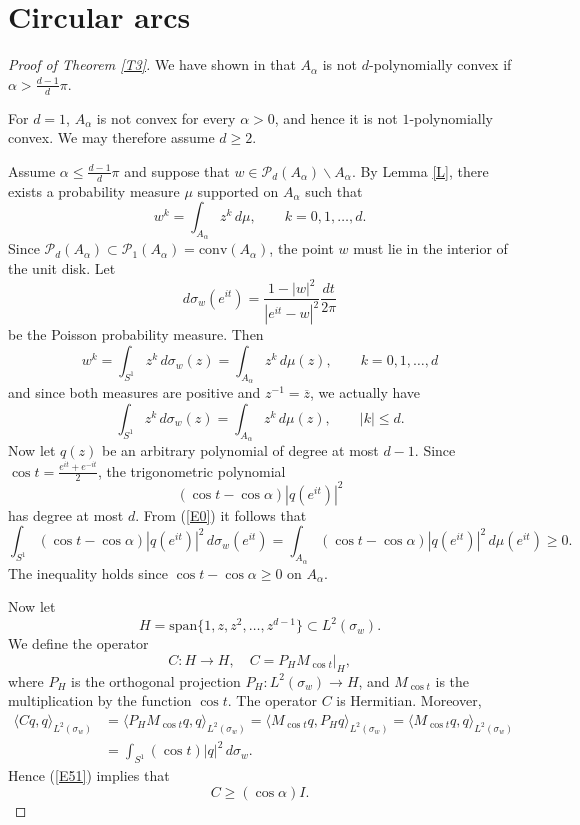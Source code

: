 \documentclass[reqno]{amsart}
\theoremstyle{definition}
\newcommand{\Conv}{{\mathrm{conv}}}
\newcommand{\Span}{{\mathrm{span}}}
\newcommand{\cP}{\mathcal{P}}
\def\bar{\overline}
\numberwithin{equation}{section}
\begin{document}
\section{Circular arcs}
\begin{proof}[Proof of Theorem \ref{T3}] We have shown in \cite[Proposition~16]{S} that $A_\alpha$ is not $d$-polynomially convex if $\alpha>\frac{d-1}{d}\pi$. 

For $d=1$, $A_\alpha$ is not convex for every $\alpha>0$, and hence it is not $1$-polynomially convex. We may therefore assume $d\ge 2$.

Assume $\alpha\le\frac{d-1}{d}\pi$ and suppose that $w\in\cP_d(A_\alpha)\backslash A_\alpha$. 
By Lemma \ref{L}, there exists a probability measure $\mu$ supported on $A_\alpha$ such that 
\[w^k=\int_{A_\alpha} z^k\,d\mu,\qquad k=0,1,\ldots,d.\] 
Since $\cP_d(A_\alpha)\subset\cP_1(A_\alpha)=\Conv(A_\alpha)$, the point $w$ must lie in the interior of the unit disk. Let 
\[d\sigma_w(e^{it})=\frac{1-|w|^2}{|e^{it}-w|^2}\frac{dt}{2\pi}\]
be the Poisson probability measure. Then
\[w^k=\int_{S^1}z^k\,d\sigma_w(z)=\int_{A_\alpha} z^k\,d\mu(z),\qquad k=0,1,\ldots,d\] 
and since both measures are positive and $z^{-1}=\bar z$, we actually have
\begin{equation}\label{E0}
	\int_{S^1}z^k\,d\sigma_w(z)=\int_{A_\alpha} z^k\,d\mu(z),\qquad |k|\le d.
	\end{equation}
Now let $q(z)$ be an arbitrary polynomial of degree at most $d-1$. Since
$\cos t=\frac{e^{it}+e^{-it}}{2}$, the trigonometric polynomial
\[(\cos t-\cos\alpha)|q(e^{it})|^2\] has degree at most $d$. From (\ref{E0}) it follows that
 \begin{equation}\label{E51}
 	\int_{S^1}(\cos t-\cos\alpha)|q(e^{it})|^2\,d\sigma_w(e^{it})=\int_{A_\alpha}(\cos t-\cos\alpha)|q(e^{it})|^2\,d\mu(e^{it})\ge 0.\end{equation} 
 The inequality holds since $\cos t-\cos \alpha\ge 0$ on $A_\alpha$. 
 
 Now let 
 \[H=\Span\{1,z,z^2,\ldots,z^{d-1}\}\subset L^2(\sigma_w).\] We define the operator 
 \[C:H\to H,\quad C=P_HM_{\cos t}|_H,\]
 where $P_H$ is the orthogonal projection $P_H:L^2(\sigma_w)\to H$, and $M_{\cos t}$ is the multiplication by the function $\cos t$. The operator $C$ is Hermitian. Moreover,
 \begin{align*}
 	\langle Cq,q\rangle_{L^2(\sigma_w)}&=\langle P_HM_{\cos t}q,q\rangle_{L^2(\sigma_w)}=\langle M_{\cos t}q,P_Hq\rangle_{L^2(\sigma_w)}=\langle M_{\cos t} q,q\rangle_{L^2(\sigma_w)}\\&=\int_{S^1}(\cos t) |q|^2\,d\sigma_w.
 	\end{align*}
 Hence (\ref{E51}) implies that
 \begin{equation}\label{E55}C\ge(\cos\alpha) I.\end{equation} 
 

\end{proof}
\end{document}

